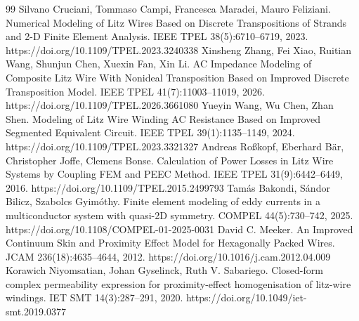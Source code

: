 \documentclass[11pt]{article}
\begin{document}
\clearpage
\begin{thebibliography}{99}
 Silvano Cruciani, Tommaso Campi, Francesca Maradei, Mauro Feliziani. Numerical Modeling of Litz Wires Based on Discrete Transpositions of Strands and 2-D Finite Element Analysis. IEEE TPEL 38(5):6710–6719, 2023. https://doi.org/10.1109/TPEL.2023.3240338
 Xinsheng Zhang, Fei Xiao, Ruitian Wang, Shunjun Chen, Xuexin Fan, Xin Li. AC Impedance Modeling of Composite Litz Wire With Nonideal Transposition Based on Improved Discrete Transposition Model. IEEE TPEL 41(7):11003–11019, 2026. https://doi.org/10.1109/TPEL.2026.3661080
 Yueyin Wang, Wu Chen, Zhan Shen. Modeling of Litz Wire Winding AC Resistance Based on Improved Segmented Equivalent Circuit. IEEE TPEL 39(1):1135–1149, 2024. https://doi.org/10.1109/TPEL.2023.3321327
 Andreas Roßkopf, Eberhard Bär, Christopher Joffe, Clemens Bonse. Calculation of Power Losses in Litz Wire Systems by Coupling FEM and PEEC Method. IEEE TPEL 31(9):6442–6449, 2016. https://doi.org/10.1109/TPEL.2015.2499793
 Tamás Bakondi, Sándor Bilicz, Szabolcs Gyimóthy. Finite element modeling of eddy currents in a multiconductor system with quasi-2D symmetry. COMPEL 44(5):730–742, 2025. https://doi.org/10.1108/COMPEL-01-2025-0031
 David C. Meeker. An Improved Continuum Skin and Proximity Effect Model for Hexagonally Packed Wires. JCAM 236(18):4635–4644, 2012. https://doi.org/10.1016/j.cam.2012.04.009
 Korawich Niyomsatian, Johan Gyselinck, Ruth V. Sabariego. Closed-form complex permeability expression for proximity-effect homogenisation of litz-wire windings. IET SMT 14(3):287–291, 2020. https://doi.org/10.1049/iet-smt.2019.0377
\end{thebibliography}
\end{document}
